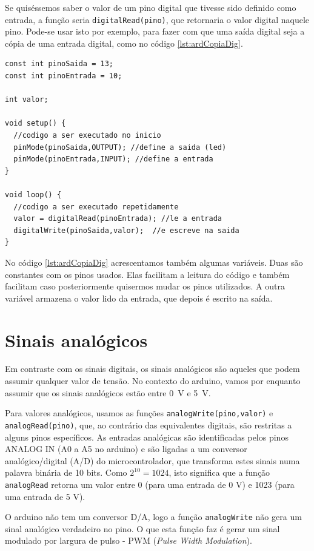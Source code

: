 Se quiséssemos saber o valor de um pino digital que tivesse sido definido como entrada, a função seria \lstinline|digitalRead(pino)|, que retornaria o valor digital naquele pino. Pode-se usar isto por exemplo, para fazer com que uma saída digital seja a cópia de uma entrada digital, como no código \ref{lst:ardCopiaDig}.
\begin{lstlisting}[caption= Programa para acender um led em função de uma entrada digital.,label=lst:ardCopiaDig]
const int pinoSaida = 13;
const int pinoEntrada = 10;

int valor;

void setup() {
  //codigo a ser executado no inicio
  pinMode(pinoSaida,OUTPUT); //define a saida (led)
  pinMode(pinoEntrada,INPUT); //define a entrada
}

void loop() {
  //codigo a ser executado repetidamente
  valor = digitalRead(pinoEntrada); //le a entrada
  digitalWrite(pinoSaida,valor);  //e escreve na saida
}	
\end{lstlisting}

No código \ref{lst:ardCopiaDig} acrescentamos também algumas variáveis. Duas são constantes com os pinos usados. Elas facilitam a leitura do código e também facilitam caso posteriormente quisermos mudar os pinos utilizados. A outra variável armazena o valor lido da entrada, que depois é escrito na saída. 

\section{Sinais analógicos}
Em contraste com os sinais digitais, os sinais analógicos são aqueles que podem assumir qualquer valor de tensão. No contexto do arduino, vamos por enquanto assumir que os sinais analógicos estão entre \SI{0}{V} e \SI{5}{V}.

Para valores analógicos, usamos as funções \lstinline|analogWrite(pino,valor)| e \lstinline|analogRead(pino)|, que, ao contrário das equivalentes digitais, são restritas a alguns pinos específicos. As entradas analógicas são identificadas pelos pinos ANALOG IN (A0 a A5 no arduino) e são ligadas a um conversor analógico/digital (A/D) do microcontrolador, que transforma estes sinais numa palavra binária de 10 bits. Como $2^{10} = 1024$, isto significa que a função \lstinline|analogRead| retorna um valor entre 0 (para uma entrada de 0 V) e 1023 (para uma entrada de 5 V).

O arduino não tem um conversor D/A, logo a função \lstinline|analogWrite| não gera um sinal analógico verdadeiro no pino. O que esta função faz é gerar um sinal modulado por largura de pulso - PWM (\emph{Pulse Width Modulation}).

